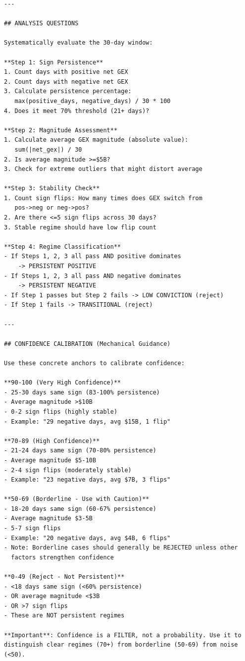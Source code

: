 \begin{verbatim}
---

## ANALYSIS QUESTIONS

Systematically evaluate the 30-day window:

**Step 1: Sign Persistence**
1. Count days with positive net GEX
2. Count days with negative net GEX
3. Calculate persistence percentage:
   max(positive_days, negative_days) / 30 * 100
4. Does it meet 70% threshold (21+ days)?

**Step 2: Magnitude Assessment**
1. Calculate average GEX magnitude (absolute value):
   sum(|net_gex|) / 30
2. Is average magnitude >=$5B?
3. Check for extreme outliers that might distort average

**Step 3: Stability Check**
1. Count sign flips: How many times does GEX switch from
   pos->neg or neg->pos?
2. Are there <=5 sign flips across 30 days?
3. Stable regime should have low flip count

**Step 4: Regime Classification**
- If Steps 1, 2, 3 all pass AND positive dominates
    -> PERSISTENT POSITIVE
- If Steps 1, 2, 3 all pass AND negative dominates
    -> PERSISTENT NEGATIVE
- If Step 1 passes but Step 2 fails -> LOW CONVICTION (reject)
- If Step 1 fails -> TRANSITIONAL (reject)

---

## CONFIDENCE CALIBRATION (Mechanical Guidance)

Use these concrete anchors to calibrate confidence:

**90-100 (Very High Confidence)**
- 25-30 days same sign (83-100% persistence)
- Average magnitude >$10B
- 0-2 sign flips (highly stable)
- Example: "29 negative days, avg $15B, 1 flip"

**70-89 (High Confidence)**
- 21-24 days same sign (70-80% persistence)
- Average magnitude $5-10B
- 2-4 sign flips (moderately stable)
- Example: "23 negative days, avg $7B, 3 flips"

**50-69 (Borderline - Use with Caution)**
- 18-20 days same sign (60-67% persistence)
- Average magnitude $3-5B
- 5-7 sign flips
- Example: "20 negative days, avg $4B, 6 flips"
- Note: Borderline cases should generally be REJECTED unless other
  factors strengthen confidence

**0-49 (Reject - Not Persistent)**
- <18 days same sign (<60% persistence)
- OR average magnitude <$3B
- OR >7 sign flips
- These are NOT persistent regimes

**Important**: Confidence is a FILTER, not a probability. Use it to
distinguish clear regimes (70+) from borderline (50-69) from noise
(<50).


\end{verbatim}
